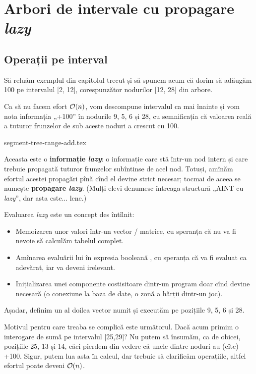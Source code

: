 \documentclass[../main.tex]{subfiles}
\begin{document}
\chapter{Arbori de intervale cu propagare \textit{lazy}}
\label{chapter:segment-trees-lazy}

\section{Operații pe interval}

Să reluăm exemplul din capitolul trecut și să spunem acum că dorim să adăugăm 100 pe intervalul [2, 12], corespunzător nodurilor [12, 28] din arbore.

Ca să nu facem efort $\mathcal{O}(n)$, vom descompune intervalul ca mai înainte și vom nota informația „+100” în nodurile 9, 5, 6 și 28, cu semnificația că valoarea reală a tuturor frunzelor de sub aceste noduri a crescut cu 100.

{segment-tree-range-add.tex}

Aceasta este o \textbf{informație \textit{lazy}}: o informație care stă într-un nod intern și care trebuie propagată tuturor frunzelor subîntinse de acel nod. Totuși, amînăm efortul acestei propagări pînă cînd el devine strict necesar; tocmai de aceea se numește \textbf{propagare \textit{lazy}}. (Mulți elevi denumesc întreaga structură „AINT cu \textit{lazy}”, dar asta este... lene.)

Evaluarea \textit{lazy} este un concept des întîlnit:

\begin{itemize}
  \item Memoizarea unor valori într-un vector / matrice, cu speranța că nu va fi nevoie să calculăm tabelul complet.

  \item Amînarea evaluării lui  în expresia booleană , cu speranța că  va fi evaluat ca adevărat, iar  va deveni irelevant.

  \item Inițializarea unei componente costisitoare dintr-un program doar cînd devine necesară (o conexiune la baza de date, o zonă a hărții dintr-un joc).
\end{itemize}

Așadar, definim un al doilea vector numit  și executăm  pe pozițiile 9, 5, 6 și 28.

Motivul pentru care treaba se complică este următorul. Dacă acum primim o interogare de sumă pe intervalul [25,29]? Nu putem să însumăm, ca de obicei, pozițiile 25, 13 și 14, căci pierdem din vedere că unele dintre noduri au (cîte) +100. Sigur, putem lua asta în calcul, dar trebuie să clarificăm operațiile, altfel efortul poate deveni $\mathcal{O}(n)$.
\end{document}
